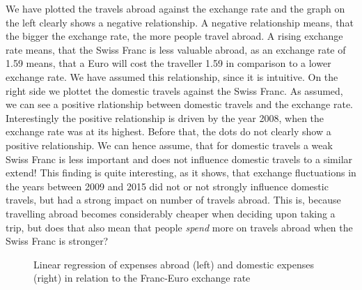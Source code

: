 \documentclass[12pt,a4paper,bibliography=totocnumbered,listof=totocnumbered]{scrartcl}
\begin{document}
We have plotted the travels abroad against the exchange rate and the graph on the left clearly shows a negative relationship. A negative relationship means, that the bigger the exchange rate, the more people travel abroad. A rising exchange rate means, that the Swiss Franc is less valuable abroad, as an exchange rate of 1.59 means, that a Euro will cost the traveller 1.59 in comparison to a lower exchange rate. We have assumed this relationship, since it is intuitive. On the right side we plottet the domestic travels against the Swiss Franc. As assumed, we can see a positive rlationship between domestic travels and the exchange rate. Interestingly the positive relationship is driven by the year 2008, when the exchange rate was at its highest. Before that, the dots do not clearly show a positive relationship. We can hence assume, that for domestic travels a weak Swiss Franc is less important and does not influence domestic travels to a similar extend! This finding is quite interesting, as it shows, that exchange fluctuations in the years between 2009 and 2015 did not or not strongly influence domestic travels, but had a strong impact on number of travels abroad. This is, because travelling abroad becomes considerably cheaper when deciding upon taking a trip, but does that also mean that people \textit{spend} more on travels abroad when the Swiss Franc is stronger? 

\begin{figure}
\centering
     \qquad
\caption{Linear regression of expenses abroad (left) and domestic expenses (right) in relation to the Franc-Euro exchange rate}
\end{figure}
\end{document}
